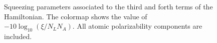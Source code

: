 \begin{figure}
\begin{minipage}{.91\linewidth}
\centering
{}
\end{minipage}
\par\medskip
\begin{minipage}{.91\linewidth}
\centering
{}
\end{minipage}
\caption{Squeezing parameters associated to the third and forth terms of the Hamiltonian. The 
colormap shows the value of $ -10\log_{10}(\xi/N_LN_A) $.  All atomic polarizability components are 
included. }
\label{fig:squeezingparaTerms_total}
\end{figure}


